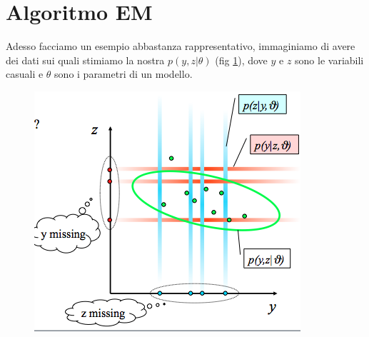 \section{Algoritmo EM}
\noindent Adesso facciamo un esempio abbastanza rappresentativo, immaginiamo di avere dei dati sui quali stimiamo la nostra $p(y,z|\theta)$ (fig \ref{figEM}), dove $y$ e $z$ sono le variabili casuali e $\theta$ sono i parametri di un modello.
\begin{figure}
\centering
\includegraphics[scale=0.7]{img/figEM.png}
\caption{}
\label{figEM}
\end{figure}

